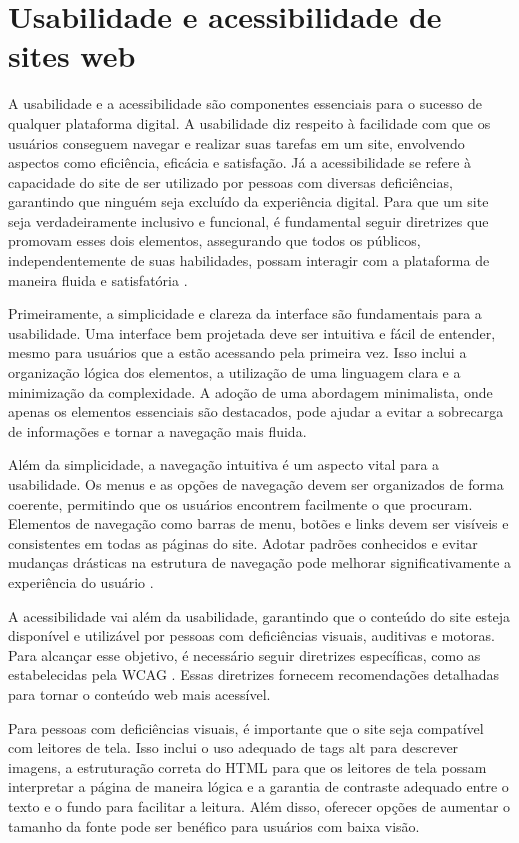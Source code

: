\section{Usabilidade e acessibilidade de sites web}

A usabilidade e a acessibilidade são componentes essenciais para o sucesso de qualquer plataforma digital. A usabilidade diz respeito à facilidade com que os usuários conseguem navegar e realizar suas tarefas em um site, envolvendo aspectos como eficiência, eficácia e satisfação. Já a acessibilidade se refere à capacidade do site de ser utilizado por pessoas com diversas deficiências, garantindo que ninguém seja excluído da experiência digital. Para que um site seja verdadeiramente inclusivo e funcional, é fundamental seguir diretrizes que promovam esses dois elementos, assegurando que todos os públicos, independentemente de suas habilidades, possam interagir com a plataforma de maneira fluida e satisfatória \cite{rodrigues2008acessibilidade}.

Primeiramente, a simplicidade e clareza da interface são fundamentais para a usabilidade. Uma interface bem projetada deve ser intuitiva e fácil de entender, mesmo para usuários que a estão acessando pela primeira vez. Isso inclui a organização lógica dos elementos, a utilização de uma linguagem clara e a minimização da complexidade. A adoção de uma abordagem minimalista, onde apenas os elementos essenciais são destacados, pode ajudar a evitar a sobrecarga de informações e tornar a navegação mais fluida.

Além da simplicidade, a navegação intuitiva é um aspecto vital para a usabilidade. Os menus e as opções de navegação devem ser organizados de forma coerente, permitindo que os usuários encontrem facilmente o que procuram. Elementos de navegação como barras de menu, botões e links devem ser visíveis e consistentes em todas as páginas do site. Adotar padrões conhecidos e evitar mudanças drásticas na estrutura de navegação pode melhorar significativamente a experiência do usuário \cite{islam2016towards}.

A acessibilidade vai além da usabilidade, garantindo que o conteúdo do site esteja disponível e utilizável por pessoas com deficiências visuais, auditivas e motoras. Para alcançar esse objetivo, é necessário seguir diretrizes específicas, como as estabelecidas pela \ac{WCAG} \cite{wcag2020}. Essas diretrizes fornecem recomendações detalhadas para tornar o conteúdo web mais acessível.

Para pessoas com deficiências visuais, é importante que o site seja compatível com leitores de tela. Isso inclui o uso adequado de tags alt para descrever imagens, a estruturação correta do \ac{HTML} para que os leitores de tela possam interpretar a página de maneira lógica e a garantia de contraste adequado entre o texto e o fundo para facilitar a leitura. Além disso, oferecer opções de aumentar o tamanho da fonte pode ser benéfico para usuários com baixa visão.

